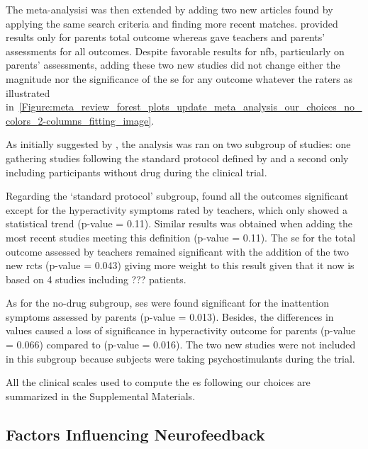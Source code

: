 The meta-analysisi was then extended by adding two new articles \citep{Strehl2017, Baumeister2016} found 
by applying the same search criteria and finding more recent matches. \citet{Baumeister2016} provided results only for parents total outcome whereas \citet{Strehl2017} gave teachers 
and parents' assessments for all outcomes. Despite favorable results for \gls{nfb}, particularly on parents' assessments, adding these two 
new studies did not change either the magnitude nor the significance of the \gls{se} for any outcome whatever the raters
as illustrated in~\ref{Figure:meta_review_forest_plots_update_meta_analysis_our_choices_no_colors_2-columns_fitting_image}. 
 
As initially suggested by \citeauthor{Cortese2016}, the analysis was ran on two subgroup of studies: one gathering studies following the standard protocol defined by \citet{Arns2014}
and a second only including participants without drug during the clinical trial. 

Regarding the `standard protocol' subgroup, \citet{Cortese2016} found all the outcomes significant except for the hyperactivity symptoms 
rated by teachers, which only showed a statistical trend (p-value = 0.11). Similar results was obtained when adding the most recent
studies meeting this definition \citep{Strehl2017}
(p-value = 0.11). The \gls{se} for the total outcome assessed by teachers remained significant with the addition of the two new
\glspl{rct} (p-value = 0.043) giving more weight to this result given that it now is based on 4 studies including ???
patients.

As for the no-drug subgroup, \glspl{se} were found significant for the inattention symptoms assessed by parents (p-value = 0.013). 
Besides, the differences in \citet{Arnold2014} values caused a loss of significance in hyperactivity outcome for parents (p-value = 0.066)
compared to \citet{Cortese2016} (p-value = 0.016). The two new studies were not 
included in this subgroup because subjects were taking psychostimulants during the trial.

All the clinical scales used to compute the \gls{es} following our choices are summarized in the Supplemental Materials.

\subsection{Factors Influencing Neurofeedback}

